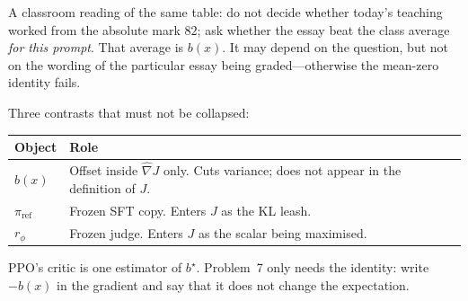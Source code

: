 \documentclass[11pt,a4paper]{article}
\theoremstyle{definition}
\begin{document}
\begin{remark}
A classroom reading of the same table: do not decide whether today's teaching worked from the absolute mark \(82\); ask whether the essay beat the class average \emph{for this prompt}. That average is \(b(x)\). It may depend on the question, but not on the wording of the particular essay being graded---otherwise the mean-zero identity fails.

Three contrasts that must not be collapsed:

{\small
\setlength{\tabcolsep}{3.5pt}
\renewcommand{\arraystretch}{1.16}
\begin{center}
\begin{tabularx}{\linewidth}{|
  >{\raggedright\arraybackslash}p{2.35cm}|
  >{\raggedright\arraybackslash}X|
}
\hline
\textbf{Object} & \textbf{Role} \\
\hline
\(b(x)\) & Offset inside \(\widehat{\nabla}J\) only. Cuts variance; does not appear in the definition of \(J\). \\
\hline
\(\pi_{\mathrm{ref}}\) & Frozen SFT copy. Enters \(J\) as the KL leash. \\
\hline
\(r_\phi\) & Frozen judge. Enters \(J\) as the scalar being maximised. \\
\hline
\end{tabularx}
\end{center}
}

PPO's critic is one estimator of \(b^\star\). Problem~7 only needs the identity: write \(-b(x)\) in the gradient and say that it does not change the expectation.
\end{remark}
\end{document}
